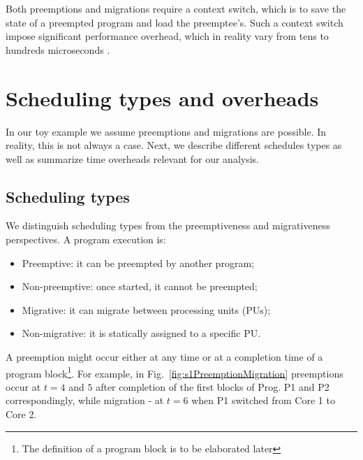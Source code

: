 Both preemptions and migrations require a context switch, which is to save the state of a preempted program and load the preemptee's. Such a context switch impose significant performance overhead, which in reality vary from tens to hundreds microseconds \cite{Mogul1991, David2007, McVoy1996}.



\section{Scheduling types and overheads}
\label{sec:heterogeneousScheduling}

In our toy example we assume preemptions and migrations are possible. In reality, this is not always a case. Next, we describe different schedules types as well as summarize time overheads relevant for our analysis.

\subsection*{\textbf{Scheduling types}}
\label{sec:schedulingTypes}

We distinguish scheduling types from the preemptiveness and migrativeness perspectives. A program execution is:
%
\begin{itemize}
\item{Preemptive:} it can be preempted by another program;
\item{Non-preemptive:} once started, it cannot be preempted;
\item{Migrative:} it can migrate between processing units (PUs);
\item{Non-migrative:} it is statically assigned to a specific PU.
\end{itemize}

A preemption might occur either at any time or at a completion time of a program block\footnote{The definition of a program block is to be elaborated later}. For example, in Fig.~\ref{fig:s1PreemptionMigration} preemptions occur at $t=4$ and $5$ after completion of the first blocks of Prog. P1 and P2 correspondingly, while migration \-- at $t=6$ when P1 switched from Core 1 to Core 2.

